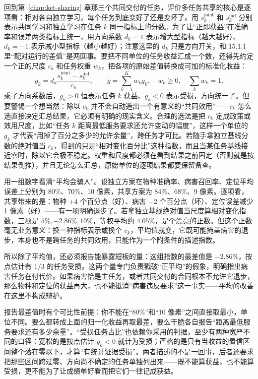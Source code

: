 回到第~\ref{chap:ket-sharing} 章那三个共同交付的任务，评价多任务共享的核心是逐项看：相对各自独立学习，每个任务到底变好了还是变坏了。用 $s_k^{\mathrm{joint}}$ 和 $s_k^{\mathrm{ind}}$ 分别表示共同学习和独立学习在任务 $k$ 同一指标上的分数。为了让“正即获益”在准确率和误差两类指标上统一，用方向系数 $d_k=1$ 表示增大型指标（越大越好）、$d_k=-1$ 表示减小型指标（越小越好）；注意这里的 $d_k$ 只是方向开关，和 15.1.1 里“配对运行的差值”是两回事。要把不同单位的任务收益汇成一个数，还得先约定一个正的尺度 $c_k$ 和任务权重 $w_k$，把各项的原始差值转换成可加的标准化收益：
\begin{equation}
  g_k=d_k\frac{s_k^{\mathrm{joint}}-s_k^{\mathrm{ind}}}{c_k},
  \qquad \bar g=\sum_{k=1}^{K}w_kg_k,\quad
  w_k\geq0,\quad\sum_kw_k=1.
  \label{eq:ket-evaluation-multitask-gain}
\end{equation}
乘了方向系数后，$g_k>0$ 恒表示任务 $k$ 获益、$g_k<0$ 表示受损，方向统一了。但要警惕一个想当然：除以 $c_k$ 并不会自动造出一个有意义的“共同效用”——$c_k$ 怎么选直接决定汇总结果，它必须有明确的现实含义。合理的选法是把 $c_k$ 定成政策或效用尺度，比如“任务 $k$ 距离最低服务要求还允许变动的幅度”，这样一个单位的 $g_k$ 才代表“用掉了百分之多少的允许余量”，跨任务才可比。若随手拿独立基线分数的绝对值当 $c_k$，得到的只是“相对变化百分比”这种指数，而且当某任务基线接近零时，除以它会极不稳定。权重和尺度都必须在看到结果之前固定（否则就是按结果倒推），并且无论怎么汇总，原始单位的逐项结果都要保留备查。

用一组数字看清“平均会骗人”。设独立方案在物种准确率、病害召回率、定位平均误差上分别为 80\%、70\%、10 像素，共享方案为 84\%、68\%、9 像素。逐项看，共享带来的是：物种 $+4$ 个百分点（好）、病害 $-2$ 个百分点（坏）、定位误差减少 1 像素（好）——有一项明确退步了。若拿独立基线绝对值当尺度算相对变化指数，三项是 $5\%,-2.86\%,10\%$，等权平均约 $4.05\%$，是个漂亮的正数。但这个正数毫无业务意义：换一种指标表示或换个 $c_k$，平均值就变，它既可能掩盖病害的退步，本身也不是跨任务的共同效用，只能作为一个附条件的描述指数。

所以除了平均值，还必须报告能暴露短板的量：这组指数的最差值是 $-2.86\%$，按点估计有 $1/3$ 的任务受损。这两个量专门负责戳破“正平均”的假象，明确指出病害任务在付代价。如果病害恰是主任务，或者共同交付的合同根本不允许它退步，那么物种和定位的获益再大，也不能抵消“病害违反要求”这一事实——平均的改善在这里不构成辩护。

报告最差值时有个可比性前提：你不能在“80\%”和“10 像素”之间直接取最小，单位不同。要么都转成上面的归一化收益再取最差，要么干脆各自报告“距离最低服务要求还有多少余量”。“受损任务占比”也依赖你采用的判据，至少有两种宽严不同的口径：宽松的是按点估计 $g_k<0$ 就计为受损；严格的是只有当收益的置信区间整个落在零以下，才算“有统计证据受损”。两者描述的不是一回事，后者还要求把那些区间跨过零、方向尚不确定的任务单独列出来——既不能算获益，也不能算受损，更不能为了让成绩单好看而把它们一律记成获益。

